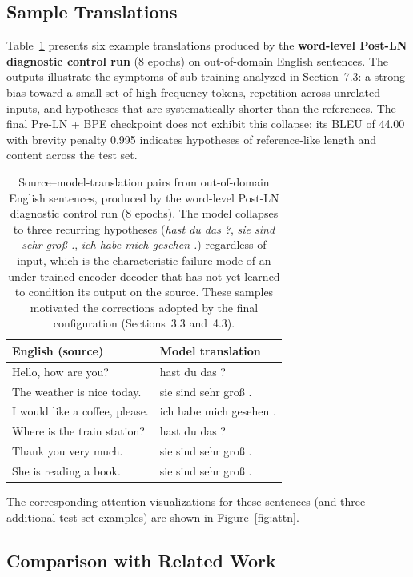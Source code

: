 \subsection{Sample Translations}

Table~\ref{tab:samples} presents six example translations produced by the \textbf{word-level Post-LN diagnostic control run} (8 epochs) on out-of-domain English sentences. The outputs illustrate the symptoms of sub-training analyzed in Section~7.3: a strong bias toward a small set of high-frequency tokens, repetition across unrelated inputs, and hypotheses that are systematically shorter than the references. The final Pre-LN + BPE checkpoint does not exhibit this collapse: its BLEU of 44.00 with brevity penalty 0.995 indicates hypotheses of reference-like length and content across the test set.

\begin{table}[h]
\centering
\begin{tabular}{ll}
\toprule
\textbf{English (source)} & \textbf{Model translation} \\
\midrule
Hello, how are you? & hast du das ? \\
The weather is nice today. & sie sind sehr gro\ss{} . \\
I would like a coffee, please. & ich habe mich gesehen . \\
Where is the train station? & hast du das ? \\
Thank you very much. & sie sind sehr gro\ss{} . \\
She is reading a book. & sie sind sehr gro\ss{} . \\
\bottomrule
\end{tabular}
\caption{Source--model-translation pairs from out-of-domain English sentences, produced by the word-level Post-LN diagnostic control run (8 epochs). The model collapses to three recurring hypotheses (\textit{hast du das ?}, \textit{sie sind sehr gro\ss{} .}, \textit{ich habe mich gesehen .}) regardless of input, which is the characteristic failure mode of an under-trained encoder-decoder that has not yet learned to condition its output on the source. These samples motivated the corrections adopted by the final configuration (Sections~3.3 and~4.3).}
\label{tab:samples}
\end{table}

The corresponding attention visualizations for these sentences (and three additional test-set examples) are shown in Figure~\ref{fig:attn}.

\subsection{Comparison with Related Work}

